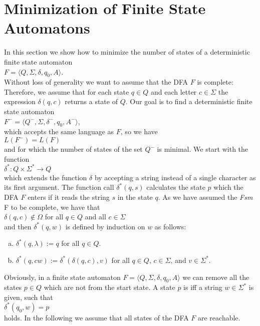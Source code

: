 \section{Minimization of Finite State Automatons}
In this section we show how to minimize the number of states of a deterministic finite state automaton
\\[0.2cm]
\hspace*{1.3cm}
$F = \langle Q, \Sigma, \delta, q_0, A \rangle$.
\\[0.2cm]
Without loss of generality we want to assume that the \textsc{DFA} $F$ is complete: Therefore, we assume that
for each state $q \in Q$ and each letter $c \in \Sigma$ the expression $\delta(q, c)$ 
returns a state of $Q$.  Our goal is to find a deterministic finite state automaton
\\[0.2cm]
\hspace*{1.3cm}
$F^- = \langle Q^-, \Sigma, \delta^-, q_0, A^- \rangle$,
\\[0.2cm]
which accepts the same language as  $F$, so we have 
\\[0.2cm]
\hspace*{1.3cm}
$L(F^-) = L(F)$
\\[0.2cm]
and for which the number of states of the set $Q^-$ is minimal.  
We start with the function 
\\[0.2cm]
\hspace*{1.3cm}
$\delta^*: Q \times \Sigma^* \rightarrow Q$
\\[0.2cm]
which extends the function $\delta$ by accepting a string instead of a single character as its first argument.
The function call $\delta^*(q,s)$ calculates the state $p$ which the \textsc{DFA} $F$ enters if it reads the
string $s$ in the state $q$. As we have assumed the \textsl{Fsm} F to be complete, we have that
\\[0.2cm]
\hspace*{1.3cm}
$\delta(q, c) \not\in \Omega$ \quad for all $q \in Q$ and all $c \in \Sigma$ 
\\[0.2cm]
and then $\delta^*(q,w)$ is defined by induction on $w$ as follows:
\begin{enumerate}[(a)]
\item $\delta^*(q, \lambda) := q$ \quad for all $q \in Q$.
\item $\delta^*(q, cw) := \delta^*(\delta(q, c), v)$ \quad for all $q \in Q$, $c \in \Sigma$, and $v \in \Sigma^*$.
\end{enumerate}

Obviously, in a finite state automaton 
$F = \langle Q, \Sigma, \delta, q_0, A \rangle$ we can remove all the states $p \in Q$ which are not
 from the start state.  A state $p$ is  iff 
a string $w \in \Sigma^*$ is given, such that
\\[0.2cm]
\hspace*{1.3cm}
$\delta^*(q_0, w) = p$
\\[0.2cm]
holds.  In the following we assume that all states of the \textsc{DFA} $F$ are reachable. 


